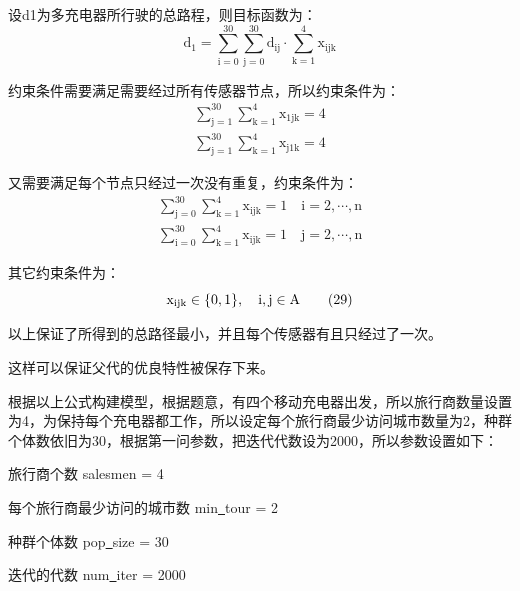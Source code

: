 \documentclass{article}
\begin{document}
设d1为多充电器所行驶的总路程，则目标函数为：
\begin{equation}
    \mathrm{d_{1}=\sum_{i=0}^{30} \sum_{j=0}^{30} d_{i j} \cdot \mathrm{\sum_{k=1}^{4} x_{i j k}}}
    \tag{24}
\end{equation}

约束条件需要满足需要经过所有传感器节点，所以约束条件为：
\begin{gather}    %
    \mathrm{\sum_{j=1}^{30} \sum_{k=1}^{4} x_{1 j k}=4} \tag{25}\\
    \mathrm{\sum_{j=1}^{30} \sum_{k=1}^{4} x_{j 1 k}=4} \tag{26}
\end{gather}  

又需要满足每个节点只经过一次没有重复，约束条件为：
\begin{gather}
    \mathrm{\sum_{j=0}^{30} \sum_{k=1}^{4} x_{i j k}=1 \quad i=2,  \cdots, n} \tag{27}\\
    \mathrm{\sum_{i=0}^{30} \sum_{k=1}^{4} x_{i j k}=1 \quad j=2, \cdots, n} \tag{28}
\end{gather}

其它约束条件为：
\begin{equation}
    \mathrm{x_{i j k} \in\{0,1\}, \quad \text  i,j \in A}
    \tag{29}
\end{equation}

以上保证了所得到的总路径最小，并且每个传感器有且只经过了一次\cite{ref6}。

这样可以保证父代的优良特性被保存下来。

根据以上公式构建模型，根据题意，有四个移动充电器出发，所以旅行商数量设置为4，为保持每个充电器都工作，所以设定每个旅行商最少访问城市数量为2，种群个体数依旧为30，根据第一问参数，把迭代代数设为2000，所以参数设置如下：

旅行商个数 salesmen = 4 

每个旅行商最少访问的城市数 min\underline{\ }tour = 2 

种群个体数 pop\underline{\ }size = 30

迭代的代数 num\underline{\ }iter = 2000
\end{document}
